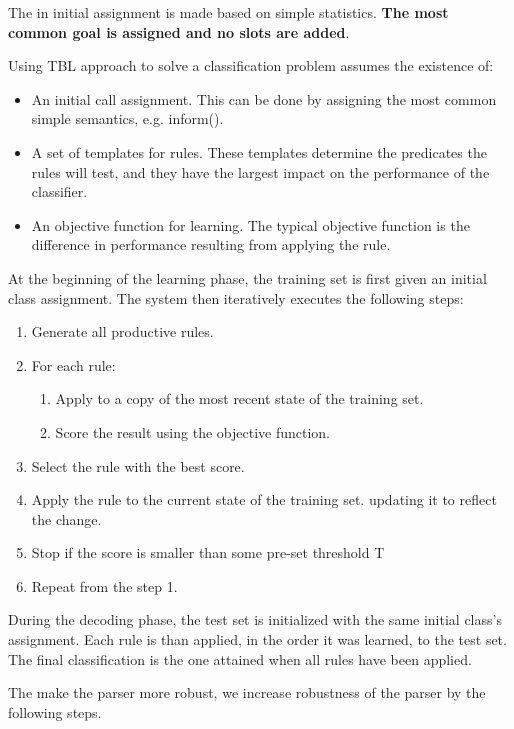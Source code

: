 \documentclass[11pt]{article}
\begin{document}
The in initial assignment is made based on simple statistics. \textbf{The most common goal is assigned and no slots are added}.

Using TBL approach to solve a classification problem assumes the existence of:
\begin{itemize}
  \item An initial call assignment. This can be done by assigning the most common simple semantics, e.g. inform().
  \item A set of templates for rules. These templates determine the predicates the rules will test, and they have the largest impact on the performance of the classifier.
  \item An objective function for learning. The typical objective function is the difference in performance resulting from applying the rule.
\end{itemize}

At the beginning of the learning phase, the training set is first given an initial class assignment. The system then iteratively executes the following steps:

\begin{enumerate}
  \item Generate all productive rules.
  \item For each rule:
  \begin{enumerate}
    \item Apply to a copy of the most recent state of the training set.
    \item Score the result using the objective function.
  \end{enumerate}
  \item Select the rule with the best score.
  \item Apply the rule  to the current state of the training set. updating it to reflect the change.
  \item Stop if the score is smaller than some pre-set threshold T
  \item Repeat from the step 1.
\end{enumerate}

During the decoding phase, the test set is initialized with the same initial class's assignment. Each rule is than applied, in the order it was learned, to the test set. The final classification is the one attained when all rules have been applied.

The make the parser more robust, we increase robustness of the parser by the following steps. 
\end{document}
